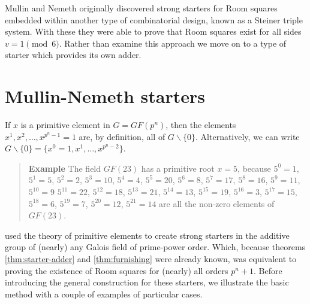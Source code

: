 \documentclass[
  11pt,
  a4paper]{book}
\newcounter{examplecounter}
\begin{document}
Mullin and Nemeth originally discovered strong starters for
Room squares embedded within another type of combinatorial
design, known as a Steiner triple system. With these they
were able to prove that Room squares exist for all sides
\(v = 1\pmod 6\). Rather than examine this approach we move on to
a type of starter which provides its own adder.

\hypertarget{mullin-nemeth-starters}{%
\section{Mullin-Nemeth starters}\label{mullin-nemeth-starters}}

If \(x\) is a primitive element in \(G = GF(p^n)\), then the elements
\(x^1, x^2, \ldots, x^{p^n - 1} = 1\) are, by definition, all of
\(G \backslash \{0\}\). Alternatively, we can write
\(G \backslash \{0\} = \{x^0 = 1, x^1, \ldots, x^{p^n - 2}\}\).

\begin{quote}  \textbf{Example } \quad 
The field $GF(23)$ has a primitive root $x = 5$, because
$5^0 = 1$, $5^1 = 5$, $5^2 = 2$, $5^3 = 10$, $5^4 = 4$,
$5^5 = 20$, $5^6 = 8$, $5^7 = 17$, $5^8 = 16$, $5^9 = 11$,
$5^{10} = 9$ $5^{11} = 22$, $5^{12} = 18$, $5^{13} = 21$,
$5^{14}  =13$, $5^{15} = 19$, $5^{16} = 3$, $5^{17} = 15$,
$5^{18} = 6$, $5^{19} = 7$, $5^{20} = 12$, $5^{21} = 14$
are all the non-zero elements of $GF(23)$.
 \end{quote}

\textcite{mullin_furnishing_1969} used the theory
of primitive elements to create strong starters in the
additive group of (nearly) any Galois field of prime-power
order. Which, because theorems
\ref{thm:starter-adder}
and
\ref{thm:furnishing}
were already
known, was equivalent to proving the existence of Room
squares for (nearly) all orders \(p^n + 1\). Before
introducing the general construction for these starters, we
illustrate the basic method with a couple of examples of
particular cases.
\end{document}
